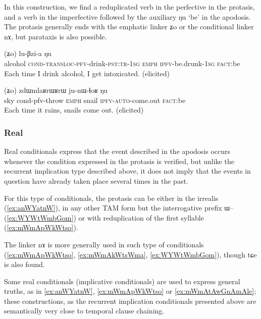 \documentclass[oldfontcommands,oneside,a4paper,11pt]{article}
\newcommand{\ipa}[1]{{\phon \mbox{#1}}} %
\begin{document}
In this construction, we find a reduplicated verb in the perfective  in the protasis, and a verb in the imperfective followed by the auxiliary \ipa{ŋu} `be'   in the apodosis. The protasis generally ends with the emphatic linker \ipa{ʑo} or the conditional linker \ipa{nɤ}, but parataxis is also possible.

     \begin{exe}
   \ex \label{ex:CWCkAtshita}
   \gll
[\ipa{cha}   	\textbf{\ipa{ɕɯ-ɕ-kɤ-tsʰi-t-a}}]   	(\ipa{ʑo})   	\ipa{lu-βzi-a}   	\ipa{ŋu}   \\
alcohol \textsc{cond-transloc-pfv}-drink-\textsc{pst:tr-1sg} \textsc{emph} \textsc{ipfv}-be.drunk-\textsc{1sg} \textsc{fact}:be\\
\glt Each time I drink alcohol, I get intoxicated. (elicited)
\end{exe}

     \begin{exe}
   \ex \label{ex:tWmW.kWkAlAt}
   \gll
[\ipa{tɯmɯ}   \textbf{	\ipa{kɯ-kɤ-lɤt}}]   	(\ipa{ʑo})   	\ipa{zdɯmlaʁrɯʁrɯ}   	\ipa{ju-nɯ-ɬoʁ}   	\ipa{ŋu}   \\
sky {cond-pfv}-throw \textsc{emph} snail \textsc{ipfv-auto}-come.out \textsc{fact}:be\\
\glt Each time it rains,  snails come out. (elicited)
\end{exe}

\subsubsection{Real} \label{sec:real.conditional}
Real conditionals express that the event described in the apodosis occurs whenever the condition expressed in the protasis is verified, but unlike the recurrent implication type described above, it does not imply that the events in question have already taken place several times in the past.

For this type of conditionals, the protasis can be either in the irrealis (\ref{ex:anWYatnW}), in any other TAM form but the interrogative prefix \ipa{ɯ}-- (\ref{ex:WYWtWmbGom}) or with reduplication of the first syllable (\ref{ex:mWmApWkWtso}). 


The linker \ipa{nɤ} is more generally used in such type of conditionals (\ref{ex:mWmApWkWtso}, \ref{ex:mWmAkWtsWma}, \ref{ex:WYWtWmbGom}), though \ipa{tɕe} is also found.


Some  real conditionals (implicative conditionals) are used to express general truths, as in \ref{ex:anWYatnW}, \ref{ex:mWmApWkWtso} or \ref{ex:mWmAtAwGnAmAle}; these constructions, as the recurrent implication conditionals presented above are semantically very close to temporal clause chaining. 
\end{document}

